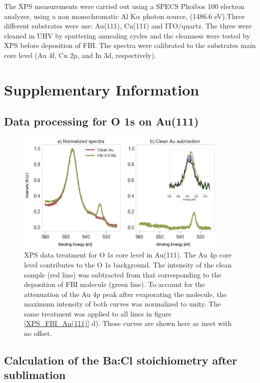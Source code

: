 \documentclass[aps,prl,reprint,longbibliography,superscriptaddress, english]{revtex4-1}
\begin{document}
The XPS measurements were carried out using a SPECS Phoibos 100 electron analyzer, using a non monochromatic Al K$\alpha$ photon source, (1486.6 eV).Three different substrates were use: Au(111), Cu(111) and  ITO/quartz. The three were cleaned in UHV by sputtering annealing cycles and the cleanness were tested by XPS before deposition of FBI. The spectra were calibrated to the substrates main core level (Au 4f, Cu 2p, and In 3d, respectively). 

 



\section{Supplementary Information}
\subsection{Data processing for O 1s on Au(111)}
\begin{figure}[ht!]
	\includegraphics[width=0.9\textwidth]{figures/si_au_subtraction.png}
	\caption{\label{Au_subtraction} 
    XPS data treatment for O 1s core level in Au(111). The Au 4p core level contributes to the O 1s background. The intensity of the clean sample (red line) was subtracted from that corresponding to the deposition of FBI molecule (green line). To account for the attenuation of the Au 4p peak after evaporating the molecule, the maximum intensity of both curves was normalized to unity. The same treatment was applied to all lines in figure \ref{XPS_FBI_Au(111)} d). Those curves are shown here as inset with no offset.}
\end{figure}  

\subsection{Calculation of the Ba:Cl stoichiometry after sublimation}
\end{document}
